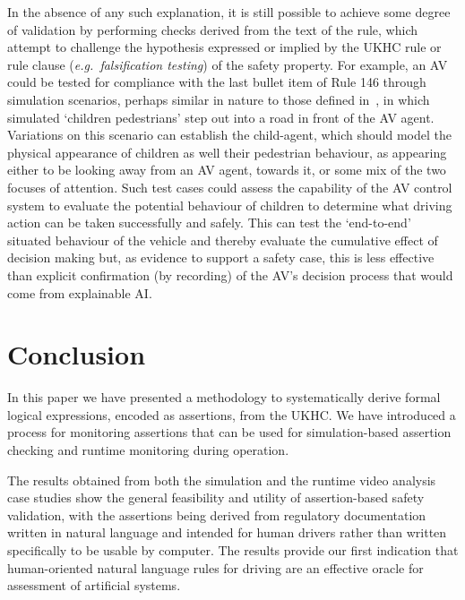 In the absence of any such explanation, it is still possible to achieve some degree of validation by performing checks derived from the text of the rule, which attempt to challenge the hypothesis expressed or implied by the UKHC rule or rule clause (\emph{e.g.\ falsification testing}) of the safety property. 
%
For example, an AV could be tested for compliance with the last bullet item of Rule 146 through simulation scenarios, perhaps similar in nature to those defined in~\cite{EuroNCAP}, in which simulated `children pedestrians' step out into a road in front of the AV agent. Variations on this scenario can establish the child-agent, which should model the physical appearance of children as well their pedestrian behaviour, as appearing either to be looking away from an AV agent, towards it, or some mix of the two focuses of attention.
%
Such test cases could assess the capability of the AV control system to evaluate the potential behaviour of children to determine what driving action can be taken successfully and safely. This can test the `end-to-end' situated behaviour of the vehicle and thereby evaluate the cumulative effect of decision making but, as evidence to support a safety case, this is less effective than explicit confirmation (by recording) of the AV's decision process that would come from explainable AI.

\section{Conclusion}\label{conclusion}

In this paper we have presented a methodology to systematically derive formal logical expressions, encoded as assertions, from the UKHC. We have introduced a process for monitoring assertions that can be used for simulation-based assertion checking and runtime monitoring during operation.

The results obtained from both the simulation and the runtime video analysis case studies show the general feasibility and utility of assertion-based safety validation, with the assertions being derived from regulatory documentation written in natural language and intended for human drivers rather than written specifically to be usable by computer. The results provide our first indication that human-oriented natural language rules for driving are an effective oracle for assessment of artificial systems.

